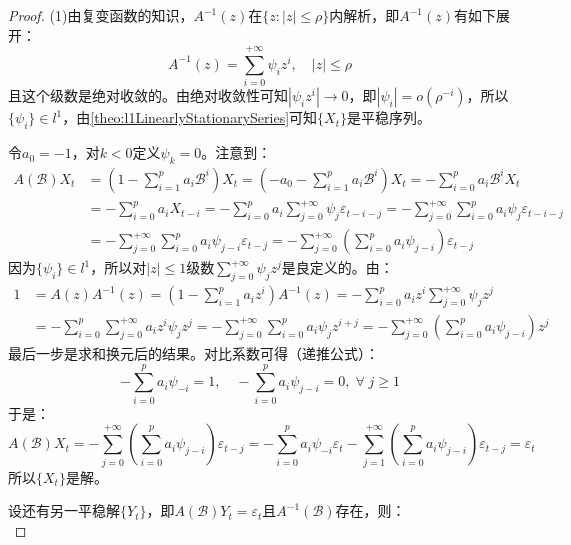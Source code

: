 \begin{proof}
	(1)由复变函数的知识，$A^{-1}(z)$在$\{z:|z|\leqslant\rho\}$内解析，即$A^{-1}(z)$有如下展开：
	\begin{equation*}
		A^{-1}(z)=\sum_{i=0}^{+\infty}\psi_iz^i,\quad|z|\leqslant\rho
	\end{equation*}
	且这个级数是绝对收敛的。由绝对收敛性可知$|\psi_iz^i|\to0$，即$|\psi_i|=o(\rho^{-i})$，所以$\{\psi_i\}\in l^1$，由\cref{theo:l1LinearlyStationarySeries}可知$\{X_t\}$是平稳序列。\par
	令$a_0=-1$，对$k<0$定义$\psi_k=0$。注意到：
	\begin{align*}
		A(\mathcal{B})X_t&=\left(1-\sum_{i=1}^{p}a_i\mathcal{B}^i\right)X_t=\left(-a_0-\sum_{i=1}^{p}a_i\mathcal{B}^i\right)X_t=-\sum_{i=0}^{p}a_i\mathcal{B}^iX_t \\
		&=-\sum_{i=0}^{p}a_iX_{t-i}=-\sum_{i=0}^{p}a_{i}\sum_{j=0}^{+\infty}\psi_j\varepsilon_{t-i-j}=-\sum_{j=0}^{+\infty}\sum_{i=0}^{p}a_i\psi_j\varepsilon_{t-i-j} \\
		&=-\sum_{j=0}^{+\infty}\sum_{i=0}^{p}a_i\psi_{j-i}\varepsilon_{t-j}=-\sum_{j=0}^{+\infty}\left(\sum_{i=0}^{p}a_i\psi_{j-i}\right)\varepsilon_{t-j}
	\end{align*}
	因为$\{\psi_i\}\in l^1$，所以对$|z|\leqslant1$级数$\sum\limits_{j=0}^{+\infty}\psi_jz^j$是良定义的。由：
	\begin{align*}
		1&=A(z)A^{-1}(z)=\left(1-\sum_{i=1}^{p}a_iz^i\right)A^{-1}(z)=-\sum_{i=0}^{p}a_iz^i\sum_{j=0}^{+\infty}\psi_jz^j \\
		&=-\sum_{i=0}^{p}\sum_{j=0}^{+\infty}a_iz^i\psi_jz^j=-\sum_{j=0}^{+\infty}\sum_{i=0}^{p}a_i\psi_jz^{i+j}=-\sum_{j=0}^{+\infty}\left(\sum_{i=0}^{p}a_i\psi_{j-i}\right)z^j
	\end{align*}
	最后一步是求和换元后的结果。对比系数可得（递推公式）：
	\begin{equation*}
		-\sum_{i=0}^{p}a_i\psi_{-i}=1,\quad-\sum_{i=0}^{p}a_i\psi_{j-i}=0,\;\forall\;j\geqslant1
	\end{equation*}
	于是：
	\begin{equation*}
		A(\mathcal{B})X_t=-\sum_{j=0}^{+\infty}\left(\sum_{i=0}^{p}a_i\psi_{j-i}\right)\varepsilon_{t-j}=-\sum_{i=0}^{p}a_i\psi_{-i}\varepsilon_t-\sum_{j=1}^{+\infty}\left(\sum_{i=0}^{p}a_i\psi_{j-i}\right)\varepsilon_{t-j}=\varepsilon_t
	\end{equation*}
	所以$\{X_t\}$是解。\par
	设还有另一平稳解$\{Y_t\}$，即$A(\mathcal{B})Y_t=\varepsilon_t$且$A^{-1}(\mathcal{B})$存在，则：
	\begin{equation*}

\end{equation*}
\end{proof}
